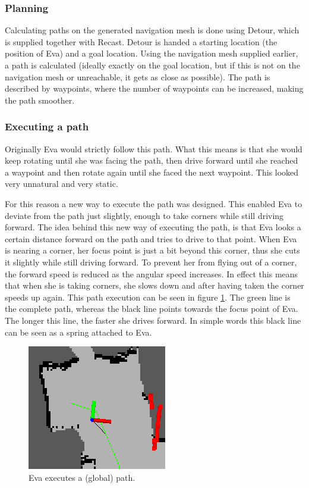 \documentclass[project_eva.tex]{subfiles}
\begin{document}
\subsubsection*{Planning}
Calculating paths on the generated navigation mesh is done using Detour, which is supplied together with Recast. Detour is handed a starting location (the position of Eva) and a goal location. Using the navigation mesh supplied earlier, a path is calculated (ideally exactly on the goal location, but if this is not on the navigation mesh or unreachable, it gets as close as possible). The path is described by waypoints, where the number of waypoints can be increased, making the path smoother.
\subsubsection*{Executing a path}
Originally Eva would strictly follow this path. What this means is that she would keep rotating until she was facing the path, then drive forward until she reached a waypoint and then rotate again until she faced the next waypoint. This looked very unnatural and very static. 

For this reason a new way to execute the path was designed. This enabled Eva to deviate from the path just slightly, enough to take corners while still driving forward. The idea behind this new way of executing the path, is that Eva looks a certain distance forward on the path and tries to drive to that point. When Eva is nearing a corner, her focus point is just a bit beyond this corner, thus she cuts it slightly while still driving forward. To prevent her from flying out of a corner, the forward speed is reduced as the angular speed increases. In effect this means that when she is taking corners, she slows down and after having taken the corner speeds up again. This path execution can be seen in figure \ref{fig:global_path}. The green line is the complete path, whereas the black line points towards the focus point of Eva. The longer this line, the faster she drives forward. In simple words this black line can be seen as a spring attached to Eva.
\begin{figure}[ht!]
	\centering
	\mbox{\includegraphics[scale=0.4]{Images/global_path.png}}
	\caption{Eva executes a (global) path.}
	\label{fig:global_path}
\end{figure}
\end{document}
